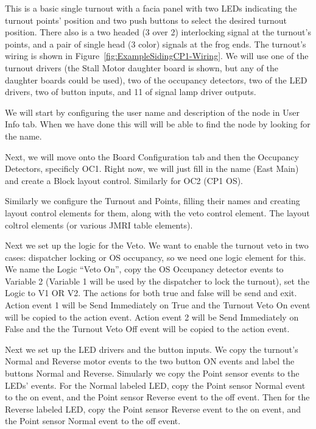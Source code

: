 This is a basic single turnout with a facia panel with two LEDs indicating the
turnout points' position and two push buttons to select the desired turnout
position. There also is a two headed (3 over 2) interlocking signal at the
turnout's points, and a pair of single head (3 color) signals at the frog
ends. The turnout's wiring is shown in 
Figure~\ref{fig:ExampleSidingCP1-Wiring}. We will use one of the turnout 
drivers (the Stall Motor daughter board is shown, but any of the daughter 
boards could be used), two of the occupancy detectors, two of the LED drivers, 
two of button inputs, and 11 of signal lamp driver outputs.

We will start by configuring the user name and description of the node in User 
Info tab.  When we have done this will will be able to find the node by 
looking for the name.  

Next, we will move onto the Board Configuration tab and then the Occupancy
Detectors, specificly OC1. Right now, we will just fill in the name (East
Main) and create a Block layout control. Similarly for OC2 (CP1 OS).

Similarly we configure the Turnout and Points, filling their names and
creating layout control elements for them, along with the veto control
element. The layout coltrol elements (or various JMRI table elements). 

Next we set up the logic for the Veto. We want to enable the turnout veto in
two cases: dispatcher locking or OS occupancy, so we need one logic element
for this. We name the Logic ``Veto On'', copy the OS Occupancy detector events
to Variable 2 (Variable 1 will be used by the dispatcher to lock the turnout),
set the Logic to V1 OR V2. The actions for both true and false will be send
and exit. Action event 1 will be Send Immediately on True and the Turnout Veto
On event will be copied to the action event. Action event 2 will be Send
Immediately on False and the the Turnout Veto Off event will be copied to the
action event.

Next we set up the LED drivers and the button inputs. We copy the turnout's
Normal and Reverse motor events to the two button ON events and label the
buttons Normal and Reverse. Simularly we copy the Point sensor events to the
LEDs' events. For the Normal labeled LED, copy the Point sensor Normal event
to the on event, and the Point sensor Reverse event to the off event. Then for
the Reverse labeled LED, copy the Point sensor Reverse event to the on event, 
and the Point sensor Normal event to the off event.

